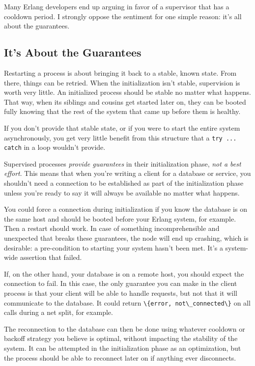 \documentclass[11pt, oneside]{book}   	%
\newcommand{\expression}[1]{\Verb`#1`}
\begin{document}
Many Erlang developers end up arguing in favor of a supervisor that has a cooldown period. I strongly oppose the sentiment for one simple reason: it's all about the guarantees.

\subsection{It's About the Guarantees}
\label{subsec:start-link-guarantees}

Restarting a process is about bringing it back to a stable, known state. From there, things can be retried. When the initialization isn't stable, supervision is worth very little. An initialized process should be stable no matter what happens. That way, when its siblings and cousins get started later on, they can be booted fully knowing that the rest of the system that came up before them is healthy.

If you don't provide that stable state, or if you were to start the entire system asynchronously, you get very little benefit from this structure that a \expression{try ... catch} in a loop wouldn't provide.

Supervised processes \emph{provide guarantees} in their initialization phase, \emph{not a best effort}. This means that when you're writing a client for a database or service, you shouldn't need a connection to be established as part of the initialization phase unless you're ready to say it will always be available no matter what happens.

You could force a connection during initialization if you know the database is on the same host and should be booted before your Erlang system, for example. Then a restart should work. In case of something incomprehensible and unexpected that breaks these guarantees, the node will end up crashing, which is desirable: a pre-condition to starting your system hasn't been met. It's a system-wide assertion that failed.

If, on the other hand, your database is on a remote host, you should expect the connection to fail. In this case, the only guarantee you can make in the client process is that your client will be able to handle requests, but not that it will communicate to the database. It could return \expression{\{error, not\_connected\}} on all calls during a net split, for example.

The reconnection to the database can then be done using whatever cooldown or backoff strategy you believe is optimal, without impacting the stability of the system. It can be attempted in the initialization phase as an optimization, but the process should be able to reconnect later on if anything ever disconnects.
\end{document}

